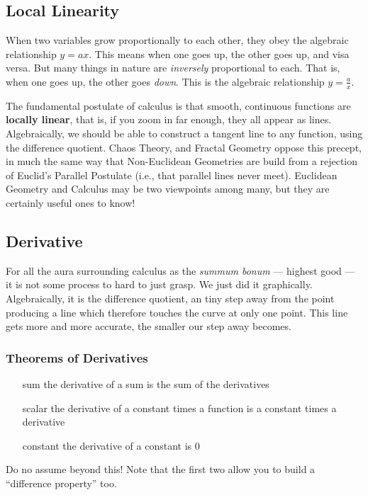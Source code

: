
\subsection{Local Linearity}



When two variables grow proportionally to each other, they obey the algebraic relationship
$y=ax$.  This means when one goes up, the other goes up, and visa versa.  But many things
in nature are \emph{inversely} proportional to each.  
That is, when one goes up, the other goes
\emph{down}.  This is the algebraic relationship $y=\frac{a}{x}$.


The fundamental postulate of calculus is that smooth, continuous functions are \textbf{locally
linear}, that is, if you zoom in far enough, they all appear as lines.  Algebraically, we should be able
to construct a tangent line to any function, using the difference quotient.  Chaos Theory, and
Fractal Geometry oppose this precept, in much the same way that Non-Euclidean Geometries
are build from a rejection of Euclid's Parallel Postulate (i.e., that parallel lines never meet).  Euclidean
Geometry and Calculus may be two viewpoints among many, but they are certainly useful ones to know!

\subsection{Derivative}
For all the aura surrounding calculus as the \textit{summum bonum} --- highest good --- it is not
some process to hard to just grasp.  We just did it graphically.  Algebraically, it is the difference 
quotient, an tiny step away from the point producing a line which therefore touches the
curve at only one point.  This line gets more and more accurate, the smaller our step away becomes.


\subsubsection{Theorems of Derivatives}

\begin{itemize}
\item[sum] the derivative of a sum is the sum of the derivatives 
\item[scalar] the derivative of a constant times a function is a constant times a derivative
\item[constant] the derivative of a constant is 0
\end{itemize}

Do no assume beyond this!  Note that the first two allow you to build a ``difference property'' too.
